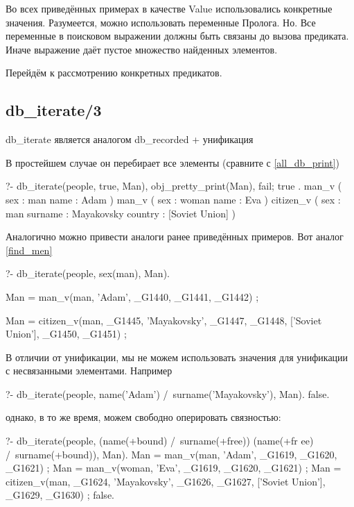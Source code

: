 \documentclass[a4paper]{book}
\begin{document}
Во всех приведённых примерах в качестве Value использовались
конкретные значения. Разумеется, можно использовать переменные
Пролога. Но. Все переменные в поисковом выражении должны быть
связаны до вызова предиката. Иначе выражение {} даёт
пустое множество найденных элементов.

Перейдём к рассмотрению конкретных предикатов.

\subsection{db\_iterate/3}
\label{db_iterate/3}

db\_iterate является аналогом db\_recorded + унификация

В простейшем случае он перебирает все элементы (сравните с
\ref{all_db_print}) 

\begin{example}{}{}
?- db_iterate(people, true, Man), obj_pretty_print(Man), fail; true
.                                                                 
man_v ( 
  sex : man 
  name : Adam 
) 
man_v ( 
  sex : woman 
  name : Eva 
) 
citizen_v ( 
  sex : man 
  surname : Mayakovsky 
  country : [Soviet Union] 
) 
\end{example}

Аналогично можно привести аналоги ранее приведённых примеров. Вот
аналог \ref{find_men}

\begin{example}{}{}
?- db_iterate(people, sex(man), Man).

Man = man_v(man, 'Adam', _G1440, _G1441, _G1442) ;

Man = citizen_v(man, _G1445, 'Mayakovsky', _G1447, _G1448, ['Soviet
 Union'], _G1450, _G1451) ;                                       
\end{example}

В отличии от унификации, мы не можем использовать значения для
унификации с несвязанными элементами. Например

\begin{example}{}{}
?- db_iterate(people, name('Adam') /\ surname('Mayakovsky'), Man). 
false.
\end{example}

однако, в то же время, можем свободно оперировать связностью:

\begin{example}{}{}
?- db_iterate(people, (name(+bound) /\ surname(+free)) \/ (name(+fr
ee) /\ surname(+bound)), Man).                                     
Man = man_v(man, 'Adam', _G1619, _G1620, _G1621) ;
Man = man_v(woman, 'Eva', _G1619, _G1620, _G1621) ;
Man = citizen_v(man, _G1624, 'Mayakovsky', _G1626, _G1627, ['Soviet
 Union'], _G1629, _G1630) ;                                       
false.
\end{example}
\end{document}
